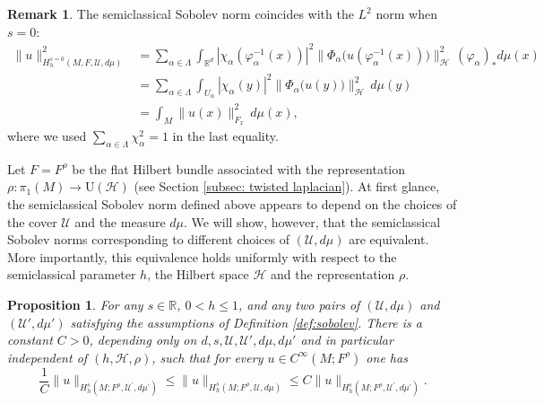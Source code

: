 \documentclass[11pt,oneside,reqno]{amsart}
\newtheorem{proposition}[theorem]{Proposition}
\theoremstyle{definition}
\newtheorem{remark}[definition]{Remark}
\numberwithin{equation}{section}
\theoremstyle{plain}
\begin{document}
\begin{remark}
    The semiclassical Sobolev norm coincides with the $L^2$ norm when $s=0$:
\begin{equation*}
\begin{aligned}
    \|u\|_{H_h^{s=0}(M, F,\mathcal{U},d\mu)}^2 
    &=\sum_{\alpha\in \Lambda} \int_{\mathbb{R}^d} |\chi_\alpha(\varphi_\alpha^{-1} (x) )|^2\big\| \Phi_\alpha \big( u( \varphi_\alpha^{-1} (x) ) \big) \big\|_{\mathcal{H}}^2 \, (\varphi_{\alpha})_{*}d\mu(x) \\
    &= \sum_{\alpha\in \Lambda} \int_{U_\alpha} |\chi_\alpha( y )|^2\big\| \Phi_\alpha \big( u( y) \big) \big\|_{\mathcal{H}}^2 \, d\mu(y) \\
    &= \int_M \|u(x)\|^2_{F_x}\,d\mu(x),
\end{aligned}
\end{equation*}
where we used $\sum_{\alpha\in \Lambda}\chi_{\alpha}^2=1$ in the last equality. 
\end{remark}

Let $F=F^\rho$ be the flat Hilbert bundle associated with the representation $\rho : \pi_1(M) \rightarrow \mathrm{U}(\mathcal{H})$ (see Section \ref{subsec: twisted laplacian}). At first glance, the semiclassical Sobolev norm defined above appears to depend on the choices of the cover $\mathcal{U}$ and the measure $d\mu$. We will show, however, that the semiclassical Sobolev norms corresponding to different choices of $(\mathcal{U},d\mu)$ are equivalent. More importantly, this equivalence holds uniformly with respect to the semiclassical parameter $h$, the Hilbert space $\mathcal{H}$ and the representation $\rho$.



\begin{proposition}\label{prop:equivsobolev}
For any $s \in \mathbb{R}$, $0<h\leq 1$, and any two pairs of $(\mathcal{U},d\mu)$ and $(\mathcal{U}',d\mu')$ satisfying the assumptions of Definition \ref{def:sobolev}. There is a constant $C>0$, depending only on $d,s,\mathcal{U}, \mathcal{U}' , d\mu,d\mu'$ and in particular independent of $(h,\mathcal{H},\rho)$, such that for every $u \in C^{\infty}(M;F^{\rho})$ one has
\begin{equation*}
    \frac{1}{C}\|u\|_{H^{s}_{h}(M;F^{\rho},\mathcal{U}^{\prime},d\mu^{\prime})}\leq \|u\|_{H^{s}_{h}(M;F^{\rho},\mathcal{U},d\mu)}\leq C\|u\|_{H^{s}_{h}(M;F^{\rho},\mathcal{U}^{\prime},d\mu^{\prime})}.
\end{equation*}

\end{proposition}
\end{document}
